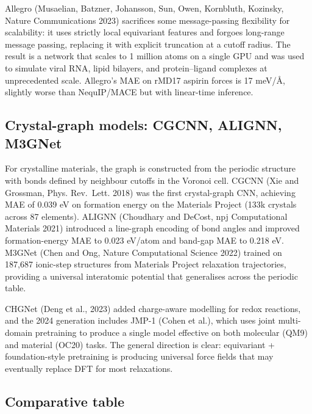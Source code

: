 Allegro (Musaelian, Batzner, Johansson, Sun, Owen, Kornbluth, Kozinsky, Nature Communications 2023) sacrifices some message-passing flexibility for scalability: it uses strictly local equivariant features and forgoes long-range message passing, replacing it with explicit truncation at a cutoff radius. The result is a network that scales to 1 million atoms on a single GPU and was used to simulate viral RNA, lipid bilayers, and protein--ligand complexes at unprecedented scale. Allegro's MAE on rMD17 aspirin forces is 17 meV/Å, slightly worse than NequIP/MACE but with linear-time inference.

\subsection{Crystal-graph models: CGCNN, ALIGNN, M3GNet}\label{crystal-graph-models-cgcnn-alignn-m3gnet}

For crystalline materials, the graph is constructed from the periodic structure with bonds defined by neighbour cutoffs in the Voronoi cell. CGCNN (Xie and Grossman, Phys. Rev.~Lett. 2018) was the first crystal-graph CNN, achieving MAE of 0.039 eV on formation energy on the Materials Project (133k crystals across 87 elements). ALIGNN (Choudhary and DeCost, npj Computational Materials 2021) introduced a line-graph encoding of bond angles and improved formation-energy MAE to 0.023 eV/atom and band-gap MAE to 0.218 eV. M3GNet (Chen and Ong, Nature Computational Science 2022) trained on 187,687 ionic-step structures from Materials Project relaxation trajectories, providing a universal interatomic potential that generalises across the periodic table.

CHGNet (Deng et al., 2023) added charge-aware modelling for redox reactions, and the 2024 generation includes JMP-1 (Cohen et al.), which uses joint multi-domain pretraining to produce a single model effective on both molecular (QM9) and material (OC20) tasks. The general direction is clear: equivariant + foundation-style pretraining is producing universal force fields that may eventually replace DFT for most relaxations.

\subsection{Comparative table}\label{comparative-table-1}

